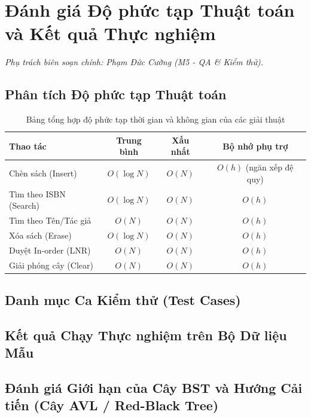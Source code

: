 \chapter{Đánh giá Độ phức tạp Thuật toán và Kết quả Thực nghiệm}
\label{chap:chuong4}

\textit{Phụ trách biên soạn chính: Phạm Đức Cường (M5 - QA \& Kiểm thử).}

\section{Phân tích Độ phức tạp Thuật toán}
\begin{table}[htbp]
\centering
\caption{Bảng tổng hợp độ phức tạp thời gian và không gian của các giải thuật}
\label{tab:complexity}
\begin{tabular}{l c c c}
\toprule
\textbf{Thao tác} & \textbf{Trung bình} & \textbf{Xấu nhất} & \textbf{Bộ nhớ phụ trợ} \\
\midrule
Chèn sách (Insert) & $O(\log N)$ & $O(N)$ & $O(h)$ (ngăn xếp đệ quy) \\
Tìm theo ISBN (Search) & $O(\log N)$ & $O(N)$ & $O(h)$ \\
Tìm theo Tên/Tác giả & $O(N)$ & $O(N)$ & $O(h)$ \\
Xóa sách (Erase) & $O(\log N)$ & $O(N)$ & $O(h)$ \\
Duyệt In-order (LNR) & $O(N)$ & $O(N)$ & $O(h)$ \\
Giải phóng cây (Clear) & $O(N)$ & $O(N)$ & $O(h)$ \\
\bottomrule
\end{tabular}
\end{table}

\section{Danh mục Ca Kiểm thử (Test Cases)}
\section{Kết quả Chạy Thực nghiệm trên Bộ Dữ liệu Mẫu}
\section{Đánh giá Giới hạn của Cây BST và Hướng Cải tiến (Cây AVL / Red-Black Tree)}
